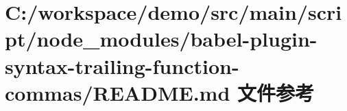 \hypertarget{node__modules_2babel-plugin-syntax-trailing-function-commas_2_r_e_a_d_m_e_8md}{}\section{C\+:/workspace/demo/src/main/script/node\+\_\+modules/babel-\/plugin-\/syntax-\/trailing-\/function-\/commas/\+R\+E\+A\+D\+ME.md 文件参考}
\label{node__modules_2babel-plugin-syntax-trailing-function-commas_2_r_e_a_d_m_e_8md}
